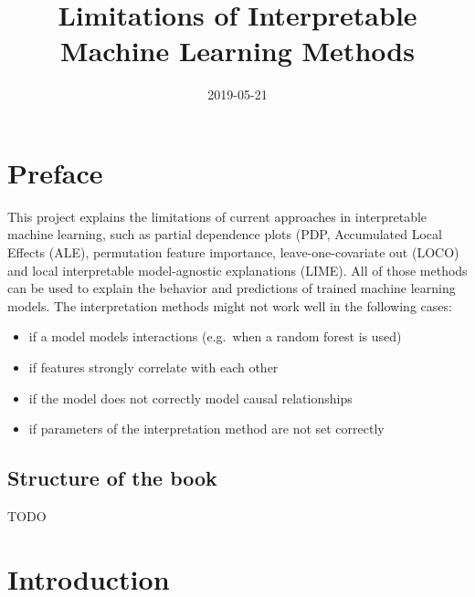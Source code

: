 \documentclass[]{krantz}
\title{Limitations of Interpretable Machine Learning Methods}
\date{2019-05-21}
\providecommand{\tightlist}{%
  \setlength{\itemsep}{0pt}\setlength{\parskip}{0pt}}
\begin{document}
\maketitle


\thispagestyle{empty}

\begin{center}
\end{center}

\setlength{\abovedisplayskip}{-5pt}
\setlength{\abovedisplayshortskip}{-5pt}

{
\hypersetup{linkcolor=black}
\setcounter{tocdepth}{2}
\tableofcontents
}
\listoftables
\listoffigures
\chapter*{Preface}\label{preface}


This project explains the limitations of current approaches in
interpretable machine learning, such as partial dependence plots (PDP,
Accumulated Local Effects (ALE), permutation feature importance,
leave-one-covariate out (LOCO) and local interpretable model-agnostic
explanations (LIME). All of those methods can be used to explain the
behavior and predictions of trained machine learning models. The
interpretation methods might not work well in the following cases:

\begin{itemize}
\tightlist
\item
  if a model models interactions (e.g.~when a random forest is used)
\item
  if features strongly correlate with each other
\item
  if the model does not correctly model causal relationships
\item
  if parameters of the interpretation method are not set correctly
\end{itemize}

\section*{Structure of the book}\label{structure-of-the-book}


TODO

\mainmatter

\chapter{Introduction}\label{introduction}
\end{document}
